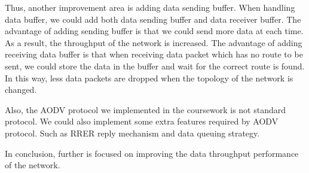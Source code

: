 Thus, another improvement area is adding data sending buffer. When handling data buffer, we could add both data sending buffer and data receiver buffer. The advantage of adding sending buffer is that we could send more data at each time. As a result, the throughput of the network is increased. The advantage of adding receiving data buffer is that when receiving data packet which has no route to be sent, we could store the data in the buffer and wait for the correct route is found. In this way, less data packets are dropped when the topology of the network is changed.

Also, the AODV protocol we implemented in the coursework is not standard protocol. We could also implement some extra features required by AODV protocol. Such as RRER reply mechanism and data queuing strategy.

In conclusion, further is focused on improving the data throughput performance of the network.







